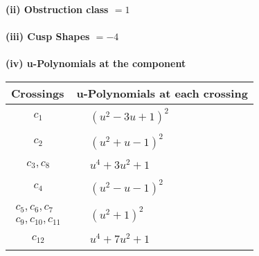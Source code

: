 \documentclass[1p]{elsarticle_modified}
\theoremstyle{definition}
\begin{document}
\flushleft \textbf{(ii) Obstruction class $= 1$}\\~\\
\flushleft \textbf{(iii) Cusp Shapes $= -4$}\\~\\
\newpage\renewcommand{\arraystretch}{1}
\flushleft \textbf{(iv) u-Polynomials at the component}\newline \\
\begin{tabular}{m{50pt}|m{274pt}}
Crossings & \hspace{64pt}u-Polynomials at each crossing \\
\hline $$\begin{aligned}c_{1}\end{aligned}$$&$\begin{aligned}
&(u^2-3 u+1)^2
\end{aligned}$\\
\hline $$\begin{aligned}c_{2}\end{aligned}$$&$\begin{aligned}
&(u^2+u-1)^2
\end{aligned}$\\
\hline $$\begin{aligned}c_{3},c_{8}\end{aligned}$$&$\begin{aligned}
&u^4+3 u^2+1
\end{aligned}$\\
\hline $$\begin{aligned}c_{4}\end{aligned}$$&$\begin{aligned}
&(u^2- u-1)^2
\end{aligned}$\\
\hline $$\begin{aligned}c_{5},c_{6},c_{7}\\c_{9},c_{10},c_{11}\end{aligned}$$&$\begin{aligned}
&(u^2+1)^2
\end{aligned}$\\
\hline $$\begin{aligned}c_{12}\end{aligned}$$&$\begin{aligned}
&u^4+7 u^2+1
\end{aligned}$\\
\hline
\end{tabular}\\~\\
\end{document}
